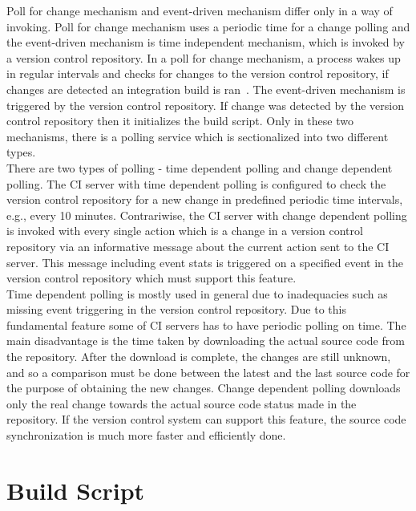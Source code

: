 Poll for change mechanism and event-driven mechanism differ only in a way of invoking. Poll for change mechanism uses a periodic time for a change polling and the event-driven mechanism is time independent mechanism, which is invoked by a version control repository. In a poll for change mechanism, a process wakes up in regular intervals and checks for changes to the version control repository, if changes are detected an integration build is ran~\cite{CIbook}. The event-driven mechanism is triggered by the version control repository. If change was detected by the version control repository then it initializes the build script. Only in these two mechanisms, there is a polling service which is sectionalized into two different types.\\

There are two types of polling - time dependent polling and change dependent polling. The CI server with time dependent polling is configured to check the version control repository for a new change in predefined periodic time intervals, e.g., every 10 minutes. Contrariwise, the CI server with change dependent polling is invoked with every single action which is a change in a version control repository via an informative message about the current action sent to the CI server. This message including event stats is triggered on a specified event in the version control repository which must support this feature.\\

Time dependent polling is mostly used in general due to inadequacies such as missing event triggering in the version control repository. Due to this fundamental feature some of CI servers has to have  periodic polling on time. The main disadvantage is the time taken by downloading the actual source code from the repository. After the download is complete, the changes are still unknown, and so a comparison must be done between the latest and the last source code for the purpose of obtaining the new changes. Change dependent polling downloads only the real change towards the actual source code status made in the repository. If the version control system can support this feature, the source code synchronization is much more faster and efficiently done.

\section{Build Script}\label{build_script}


